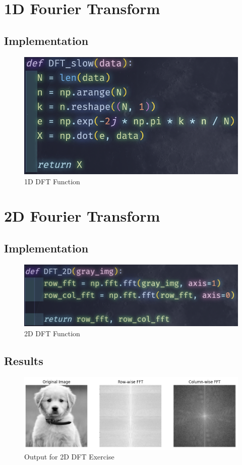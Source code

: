 \section{1D Fourier Transform}
\subsection{Implementation}
\begin{figure} [!h]
    \centering
    \includegraphics[width=1\textwidth]{img/code/1D.png}
    \caption{1D DFT Function}
\end{figure}


\newpage
\section{2D Fourier Transform}
\subsection{Implementation}
\begin{figure} [!h]
    \centering
    \includegraphics[width=1\textwidth]{img/code/2D.png}
    \caption{2D DFT Function}
\end{figure}

\subsection{Results}
\begin{figure} [!h]
    \centering
    \includegraphics[width=1\textwidth]{img/DFT_2D.png}
    \caption{Output for 2D DFT Exercise}
\end{figure}


